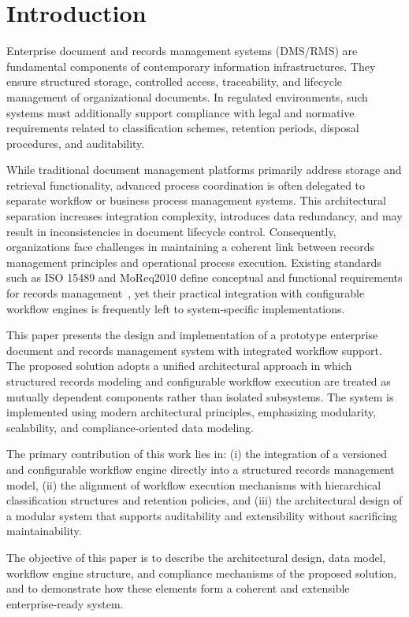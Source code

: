 ﻿%
\section*{Introduction}

Enterprise document and records management systems (DMS/RMS) are fundamental components of contemporary information infrastructures. 
They ensure structured storage, controlled access, traceability, and lifecycle management of organizational documents. 
In regulated environments, such systems must additionally support compliance with legal and normative requirements related to classification schemes, retention periods, disposal procedures, and auditability.

While traditional document management platforms primarily address storage and retrieval functionality, advanced process coordination is often delegated to separate workflow or business process management systems. 
This architectural separation increases integration complexity, introduces data redundancy, and may result in inconsistencies in document lifecycle control. 
Consequently, organizations face challenges in maintaining a coherent link between records management principles and operational process execution. 
Existing standards such as ISO 15489 and MoReq2010 define conceptual and functional requirements for records management~\cite{iso15489,moreq2010}, yet their practical integration with configurable workflow engines is frequently left to system-specific implementations.

This paper presents the design and implementation of a prototype enterprise document and records management system with integrated workflow support. 
The proposed solution adopts a unified architectural approach in which structured records modeling and configurable workflow execution are treated as mutually dependent components rather than isolated subsystems. 
The system is implemented using modern architectural principles, emphasizing modularity, scalability, and compliance-oriented data modeling.

The primary contribution of this work lies in: 
(i) the integration of a versioned and configurable workflow engine directly into a structured records management model, 
(ii) the alignment of workflow execution mechanisms with hierarchical classification structures and retention policies, and 
(iii) the architectural design of a modular system that supports auditability and extensibility without sacrificing maintainability.

The objective of this paper is to describe the architectural design, data model, workflow engine structure, and compliance mechanisms of the proposed solution, 
and to demonstrate how these elements form a coherent and extensible enterprise-ready system.